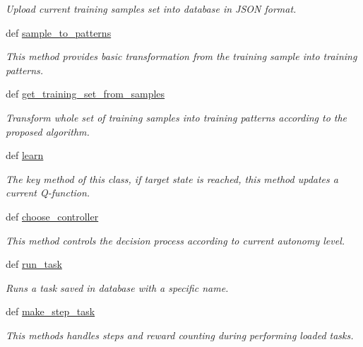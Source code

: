 \begin{DoxyCompactItemize}
\begin{DoxyCompactList}\small\item\em Upload current training samples set into database in J\+S\+O\+N format. \end{DoxyCompactList}\item 
def \hyperlink{class_n_f_q_1_1_n_f_q_aed1f496109cb75fd667748796f70af1a}{sample\+\_\+to\+\_\+patterns}
\begin{DoxyCompactList}\small\item\em This method provides basic transformation from the training sample into training patterns. \end{DoxyCompactList}\item 
def \hyperlink{class_n_f_q_1_1_n_f_q_a41bb19974711e6fdc955751d5c1c0fa0}{get\+\_\+training\+\_\+set\+\_\+from\+\_\+samples}
\begin{DoxyCompactList}\small\item\em Transform whole set of training samples into training patterns according to the proposed algorithm. \end{DoxyCompactList}\item 
def \hyperlink{class_n_f_q_1_1_n_f_q_aeb9339921d4a63f47fd93e7d7822f0e1}{learn}
\begin{DoxyCompactList}\small\item\em The key method of this class, if target state is reached, this method updates a current Q-\/function. \end{DoxyCompactList}\item 
def \hyperlink{class_n_f_q_1_1_n_f_q_a334280030ebb62b511dc4849136cee46}{choose\+\_\+controller}
\begin{DoxyCompactList}\small\item\em This method controls the decision process according to current autonomy level. \end{DoxyCompactList}\item 
def \hyperlink{class_n_f_q_1_1_n_f_q_a0647f518d9a29328eed53c958fd3bec9}{run\+\_\+task}
\begin{DoxyCompactList}\small\item\em Runs a task saved in database with a specific name. \end{DoxyCompactList}\item 
def \hyperlink{class_n_f_q_1_1_n_f_q_aada248b40fdbcbd978b62a0deb9f3aff}{make\+\_\+step\+\_\+task}
\begin{DoxyCompactList}\small\item\em This methods handles steps and reward counting during performing loaded tasks. \end{DoxyCompactList}\item 

\end{DoxyCompactItemize}
